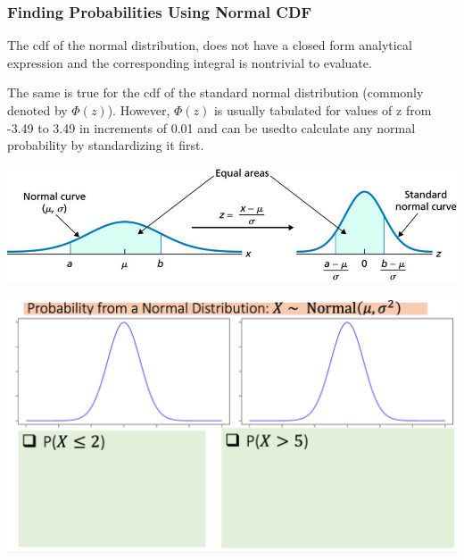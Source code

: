 \documentclass[compress]{beamer}
\begin{document}
\begin{frame}
\vspace{.1in}
\vspace{1in}
\end{frame}


\begin{frame}\frametitle{Finding Probabilities Using Normal CDF}
The cdf of the normal distribution,  does not have a closed form analytical expression and the corresponding integral is nontrivial to evaluate. 

The same is true for the cdf of the standard normal distribution (commonly denoted by $\Phi(z)$). However, $\Phi(z)$ is usually tabulated for values of z from -3.49 to 3.49 in increments of 0.01 and can be usedto calculate any normal probability by standardizing it first.

\includegraphics[scale=.6]{figs/NormalCDFStandardization.png}
\end{frame}

\begin{frame}
\includegraphics[scale=.38]{figs/GenNorm_1}
\vspace{1.5in}
\end{frame}
\end{document}
